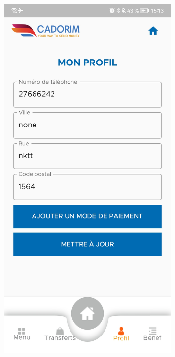 	\begin{figure}
		\centering
		\begin{subfigure}[b]{0.3\textwidth}
			\centering
			\includegraphics[width=\textwidth]{./Template LaTeX/Images/6.jpg}

\end{subfigure}
\end{figure}
